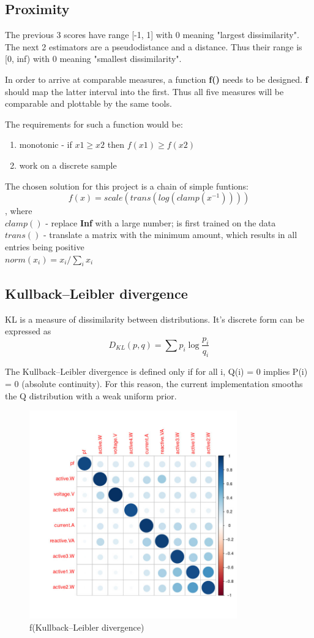 \documentclass[11pt]{article}
\newcommand{\code}[1]{\textbf{#1}}
\newcommand{\para}[0]{\par\vspace{0.5cm}}
\begin{document}
\subsection{Proximity}
The previous 3 scores have range [-1, 1] with 0 meaning "largest dissimilarity".
The next 2 estimators are a pseudodistance and a distance.
Thus their range is [0, inf) with 0 meaning "smallest dissimilarity".
\para
In order to arrive at comparable measures, a function \code{f()} needs to be designed.
\code{f} should map the latter interval into the first.
Thus all five measures will be comparable and plottable by the same tools.
\para
The requirements for such a function would be:
\begin{enumerate}
    \item{monotonic - if $x1 \ge x2$ then $f(x1) \ge f(x2)$}
    \item{work on a discrete sample}
\end{enumerate}
\para
The chosen solution for this project is a chain of simple funtions:
$$ f(x) = scale(trans(log(clamp(x^{-1})))) $$
, where \\
$ clamp() $ - replace \code{Inf} with a large number; is first trained on the data  \\
$ trans() $ - translate a matrix with the minimum amount, which results in all entries being positive  \\  
$ norm(x_i) = x_i/\sum_i x_i $  \\

\subsection{Kullback–Leibler divergence}
KL is a measure of dissimilarity between distributions.
It's discrete form can be expressed as
$$ D_{KL}(p, q) = \sum p_i \log\frac{p_i}{q_i} $$
\para
The Kullback–Leibler divergence is defined only if for all i, Q(i) = 0 implies P(i) = 0 (absolute continuity).\cite{q11}
For this reason, the current implementation smooths the Q distribution with a weak uniform prior.
\begin{figure}[!htp]
  \centering
    \includegraphics[width=0.8\textwidth]{img/kl}
    \caption{f(Kullback–Leibler divergence)}
\end{figure}
\para
\end{document}
